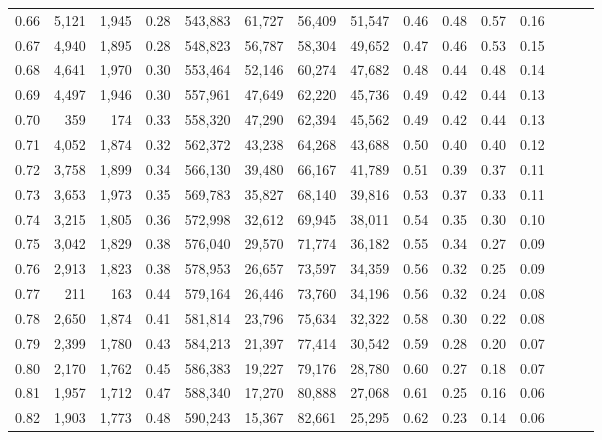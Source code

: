 \begin{tabular}{rrrrrrrrrrrrrrr}
0.66 &   5,121 &  1,945 &  0.28 &  543,883 &   61,727 &   56,409 &   51,547 &  0.46 &  0.48 &  0.57 &      0.16 \\
0.67 &   4,940 &  1,895 &  0.28 &  548,823 &   56,787 &   58,304 &   49,652 &  0.47 &  0.46 &  0.53 &      0.15 \\
0.68 &   4,641 &  1,970 &  0.30 &  553,464 &   52,146 &   60,274 &   47,682 &  0.48 &  0.44 &  0.48 &      0.14 \\
0.69 &   4,497 &  1,946 &  0.30 &  557,961 &   47,649 &   62,220 &   45,736 &  0.49 &  0.42 &  0.44 &      0.13 \\
0.70 &     359 &    174 &  0.33 &  558,320 &   47,290 &   62,394 &   45,562 &  0.49 &  0.42 &  0.44 &      0.13 \\
0.71 &   4,052 &  1,874 &  0.32 &  562,372 &   43,238 &   64,268 &   43,688 &  0.50 &  0.40 &  0.40 &      0.12 \\
0.72 &   3,758 &  1,899 &  0.34 &  566,130 &   39,480 &   66,167 &   41,789 &  0.51 &  0.39 &  0.37 &      0.11 \\
0.73 &   3,653 &  1,973 &  0.35 &  569,783 &   35,827 &   68,140 &   39,816 &  0.53 &  0.37 &  0.33 &      0.11 \\
0.74 &   3,215 &  1,805 &  0.36 &  572,998 &   32,612 &   69,945 &   38,011 &  0.54 &  0.35 &  0.30 &      0.10 \\
0.75 &   3,042 &  1,829 &  0.38 &  576,040 &   29,570 &   71,774 &   36,182 &  0.55 &  0.34 &  0.27 &      0.09 \\
0.76 &   2,913 &  1,823 &  0.38 &  578,953 &   26,657 &   73,597 &   34,359 &  0.56 &  0.32 &  0.25 &      0.09 \\
0.77 &     211 &    163 &  0.44 &  579,164 &   26,446 &   73,760 &   34,196 &  0.56 &  0.32 &  0.24 &      0.08 \\
0.78 &   2,650 &  1,874 &  0.41 &  581,814 &   23,796 &   75,634 &   32,322 &  0.58 &  0.30 &  0.22 &      0.08 \\
0.79 &   2,399 &  1,780 &  0.43 &  584,213 &   21,397 &   77,414 &   30,542 &  0.59 &  0.28 &  0.20 &      0.07 \\
0.80 &   2,170 &  1,762 &  0.45 &  586,383 &   19,227 &   79,176 &   28,780 &  0.60 &  0.27 &  0.18 &      0.07 \\
0.81 &   1,957 &  1,712 &  0.47 &  588,340 &   17,270 &   80,888 &   27,068 &  0.61 &  0.25 &  0.16 &      0.06 \\
0.82 &   1,903 &  1,773 &  0.48 &  590,243 &   15,367 &   82,661 &   25,295 &  0.62 &  0.23 &  0.14 &      0.06 \\

\end{tabular}
